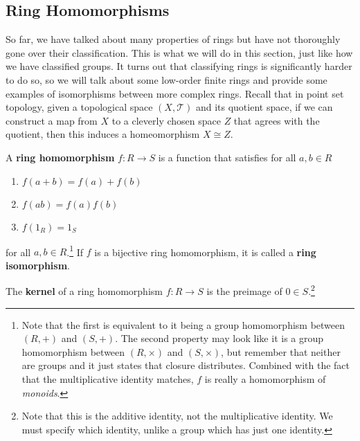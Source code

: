 \subsection{Ring Homomorphisms} 
  
  So far, we have talked about many properties of rings but have not thoroughly gone over their classification. This is what we will do in this section, just like how we have classified groups. It turns out that classifying rings is significantly harder to do so, so we will talk about some low-order finite rings and provide some examples of isomorphisms between more complex rings. Recall that in point set topology, given a topological space $(X, \mathscr{T})$ and its quotient space, if we can construct a map from $X$ to a cleverly chosen space $Z$ that agrees with the quotient, then this induces a homeomorphism $X \cong Z$. 

  \begin{definition}
    A \textbf{ring homomorphism} $f: R \rightarrow S$ is a function that satisfies for all $a, b \in R$
    \begin{enumerate}
      \item $f(a + b) = f(a) + f(b)$
      \item $f(ab) = f(a) f(b)$ 
      \item $f(1_R) = 1_S$
    \end{enumerate}
    for all $a, b \in R$.\footnote{Note that the first is equivalent to it being a group homomorphism between $(R, +)$ and $(S, +)$. The second property may look like it is a group homomorphism between $(R, \times)$ and $(S, \times)$, but remember that neither are groups and it just states that closure distributes. Combined with the fact that the multiplicative identity matches, $f$ is really a homomorphism of \textit{monoids}. } If $f$ is a bijective ring homomorphism, it is called a \textbf{ring isomorphism}. 
  \end{definition} 

  \begin{definition}[Kernel]
    The \textbf{kernel} of a ring homomorphism $f: R \rightarrow S$ is the preimage of $0 \in S$.\footnote{Note that this is the additive identity, not the multiplicative identity. We must specify which identity, unlike a group which has just one identity.}
  \end{definition}

